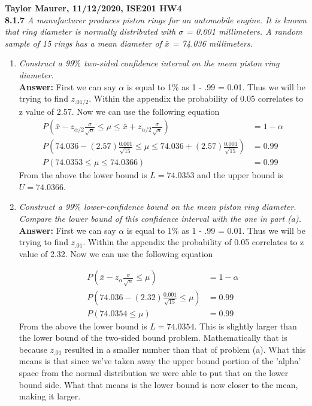 \documentclass[11pt]{article}
\begin{document}
\textbf{Taylor Maurer, 11/12/2020, ISE201 HW4} \\
\noindent \textbf{8.1.7} \emph{ A manufacturer produces piston rings for an automobile engine. It is known that ring diameter is normally distributed with $\sigma$ = 0.001 millimeters. A random sample of 15 rings has a mean diameter of $\bar{x}$ = 74.036 millimeters.}
\begin{enumerate}
\item \emph{Construct a 99$\%$ two-sided confidence interval on the mean piston ring diameter.}
\\\textbf{Answer:} First we can say $\alpha$ is equal to 1$\%$ as 1 - .99 = 0.01. Thus we will be trying to find $z_{.01/2}$. Within the appendix the probability of 0.05 correlates to z value of 2.57. Now we can use the following equation
\begin{equation}
\begin{split}
P(\bar{x} - z_{\alpha/2}\frac{\sigma}{\sqrt{n}} \leq \mu \leq \bar{x} + z_{\alpha/2}\frac{\sigma}{\sqrt{n}}) &= 1 - \alpha \\
P(74.036 - (2.57)\frac{0.001}{\sqrt{15}} \leq \mu \leq74.036 + (2.57)\frac{0.001}{\sqrt{15}}) &= 0.99 \\
P(74.0353 \leq \mu \leq 74.0366) &= 0.99
\end{split}
\end{equation}
From the above the lower bound is $L =74.0353$ and the upper bound is $U= 74.0366$.\\
\item \emph{Construct a 99$\%$ lower-confidence bound on the mean piston ring diameter. Compare the lower bound of this confidence interval with the one in part (a).}
\\\textbf{Answer:} First we can say $\alpha$ is equal to 1$\%$ as 1 - .99 = 0.01. Thus we will be trying to find $z_{.01}$. Within the appendix the probability of 0.05 correlates to z value of 2.32. Now we can use the following equation

\begin{equation}
\begin{split}
P(\bar{x} - z_{\alpha}\frac{\sigma}{\sqrt{n}} \leq \mu) &= 1 - \alpha \\
P(74.036 - (2.32)\frac{0.001}{\sqrt{15}} \leq \mu) &= 0.99 \\
P(74.0354 \leq \mu) &= 0.99
\end{split}
\end{equation}
From the above the lower bound is $L =74.0354$. This is slightly larger than the lower bound of the two-sided bound problem. Mathematically that is because $z_{.01}$ resulted in a smaller number than that of problem (a). What this means is that since we've taken away the upper bound portion of the 'alpha' space from the normal distribution we were able to put that on the lower bound side. What that means is the lower bound is now closer to the mean, making it larger. \\

\end{enumerate}
\end{document}
